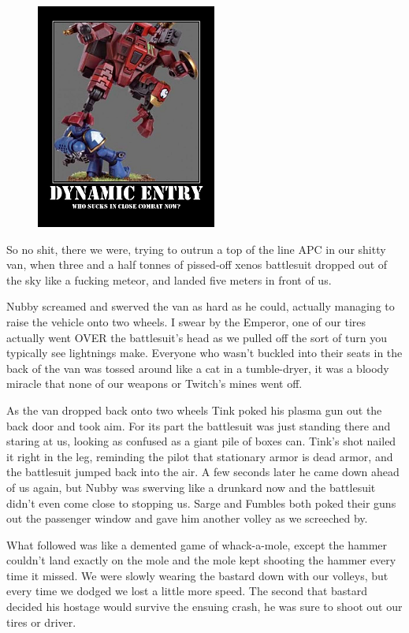 \begin{figure}
	\begin{center}
		\includegraphics[width=\figwidth]{pics/10/69.png}
	\end{center}
\end{figure}
So no shit, there we were, trying to outrun a top of the line APC in our shitty van, when three and a half tonnes of pissed-off xenos battlesuit dropped out of the sky like a fucking meteor, and landed five meters in front of us.

Nubby screamed and swerved the van as hard as he could, actually managing to raise the vehicle onto two wheels. 
I swear by the Emperor, one of our tires actually went OVER the battlesuit's head as we pulled off the sort of turn you typically see lightnings make. 
Everyone who wasn't buckled into their seats in the back of the van was tossed around like a cat in a tumble-dryer, it was a bloody miracle that none of our weapons or Twitch's mines went off.

As the van dropped back onto two wheels Tink poked his plasma gun out the back door and took aim. 
For its part the battlesuit was just standing there and staring at us, looking as confused as a giant pile of boxes can. 
Tink's shot nailed it right in the leg, reminding the pilot that stationary armor is dead armor, and the battlesuit jumped back into the air. 
A few seconds later he came down ahead of us again, but Nubby was swerving like a drunkard now and the battlesuit didn't even come close to stopping us. 
Sarge and Fumbles both poked their guns out the passenger window and gave him another volley as we screeched by.

What followed was like a demented game of whack-a-mole, except the hammer couldn't land exactly on the mole and the mole kept shooting the hammer every time it missed. 
We were slowly wearing the bastard down with our volleys, but every time we dodged we lost a little more speed. 
The second that bastard decided his hostage would survive the ensuing crash, he was sure to shoot out our tires or driver.

